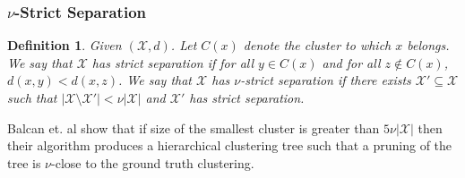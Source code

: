 \documentclass[twoside]{article}
\newcommand{\mc}{\mathcal}
\newtheorem{definition}[theorem]{Definition}
\begin{document}
\subsubsection*{$\nu$-Strict Separation \cite{balcan2008discriminative}}
\begin{definition}
Given $(\mc X, d)$. Let $C(x)$ denote the cluster to which $x$ belongs. We say that $\mc X$ has strict separation if for all $y \in C(x)$ and for all $z \not\in C(x)$, $d(x,y) < d(x,z)$. We say that $\mc X$ has $\nu$-strict separation if there exists $\mc X' \subseteq \mc X$ such that $|\mc X\setminus \mc X'| < \nu|\mc X|$ and $\mc X'$ has strict separation.
\end{definition}
Balcan et. al \cite{balcan2008discriminative} show that if size of the smallest cluster is greater than $5\nu|\mc X|$ then their algorithm produces a hierarchical clustering tree such that a pruning of the tree is $\nu$-close to the ground truth clustering. 
\end{document}
